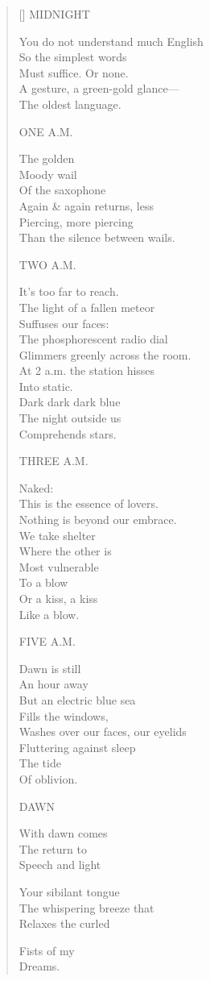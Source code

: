 \label{ch:night_early}
\settowidth{\versewidth}{Washes over our faces, our eyelids}
\begin{verse}[\versewidth]
MIDNIGHT

You do not understand much English\\
So the simplest words\\
Must suffice.     Or none.\\
A gesture, a green-gold glance---\\
The oldest language.

ONE A.M.

The golden\\
Moody wail\\
Of the saxophone\\
Again \& again returns, less\\
Piercing, more piercing\\
Than the silence between wails.

TWO A.M.

It's too far to reach.\\
The light of a fallen meteor\\
Suffuses our faces:\\
The phosphorescent radio dial\\
Glimmers greenly across the room.\\
At 2 a.m. the station hisses\\
Into static.\\
Dark dark dark blue\\
The night outside us\\
Comprehends stars.

THREE A.M.

Naked:\\
This is the essence of lovers.\\
Nothing is beyond our embrace.\\
We take shelter\\
Where the other is\\
Most vulnerable\\
To a blow\\
Or a kiss, a kiss\\
Like a blow.

FIVE A.M.

Dawn is still\\
An hour away\\
But an electric blue sea\\
Fills the windows,\\
Washes over our faces, our eyelids\\
Fluttering against sleep\\
The tide\\
Of oblivion.

DAWN

With dawn comes\\
The return to\\
Speech and light

Your sibilant tongue\\
The whispering breeze that\\
Relaxes the curled

Fists of my\\
Dreams.
\end{verse}
